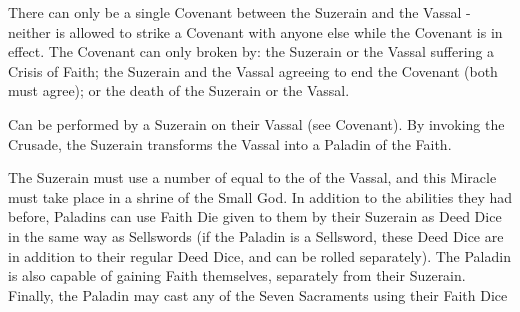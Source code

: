{

There can only be a single Covenant between the Suzerain and the Vassal - neither is allowed to strike a Covenant with anyone else while the Covenant is in effect.  The Covenant can only broken by: the Suzerain or the Vassal suffering a Crisis of Faith; the Suzerain and the Vassal agreeing to end the Covenant (both must agree); or the death of the Suzerain or the Vassal.




Can be performed by a Suzerain on their Vassal (see Covenant).  By invoking the Crusade, the Suzerain transforms the Vassal into a Paladin of the Faith.  

The Suzerain must use a number of \DICE equal to the \LVL of the Vassal, and this Miracle must take place in a shrine of the Small God.  In addition to the abilities they had before, Paladins can use Faith Die given to them by their Suzerain as Deed Dice in the same way as Sellswords (if the Paladin is a Sellsword, these Deed Dice are in addition to their regular Deed Dice, and can be rolled separately).  The Paladin is also capable of gaining Faith themselves, separately from their Suzerain.  Finally, the Paladin may cast any of the Seven Sacraments using their Faith Dice

}
